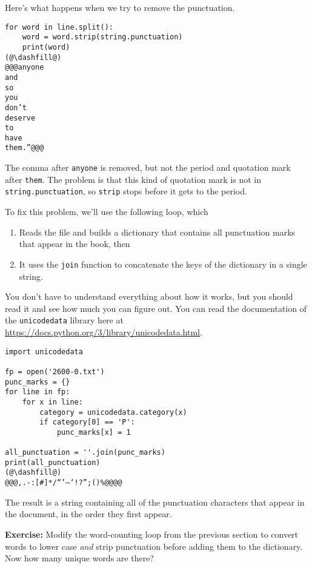 Here's what happens when we try to remove the punctuation.

\begin{lstlisting}[]
for word in line.split():
    word = word.strip(string.punctuation)
    print(word)
(@\dashfill@)
@@@anyone
and
so
you
don’t
deserve
to
have
them.”@@@
\end{lstlisting}

The comma after \passthrough{\lstinline!anyone!} is removed, but not the
period and quotation mark after \passthrough{\lstinline!them!}. The
problem is that this kind of quotation mark is not in
\passthrough{\lstinline!string.punctuation!}, so
\passthrough{\lstinline!strip!} stops before it gets to the period.

To fix this problem, we'll use the following loop, which

\begin{enumerate}
\def\labelenumi{\arabic{enumi}.}
\item
  Reads the file and builds a dictionary that contains all punctuation
  marks that appear in the book, then
\item
  It uses the \passthrough{\lstinline!join!} function to concatenate the
  keys of the dictionary in a single string.
\end{enumerate}

You don't have to understand everything about how it works, but you
should read it and see how much you can figure out. You can read the
documentation of the \passthrough{\lstinline!unicodedata!} library here
at \url{https://docs.python.org/3/library/unicodedata.html}.

\begin{lstlisting}[]
import unicodedata

fp = open('2600-0.txt')
punc_marks = {}
for line in fp:
    for x in line:
        category = unicodedata.category(x)
        if category[0] == 'P':
            punc_marks[x] = 1
        
all_punctuation = ''.join(punc_marks)
print(all_punctuation)
(@\dashfill@)
@@@,.-:[#]*/“’—‘!?”;()%@@@@
\end{lstlisting}

The result is a string containing all of the punctuation characters that
appear in the document, in the order they first appear.

\textbf{Exercise:} Modify the word-counting loop from the previous
section to convert words to lower case \emph{and} strip punctuation
before adding them to the dictionary. Now how many unique words are
there?

